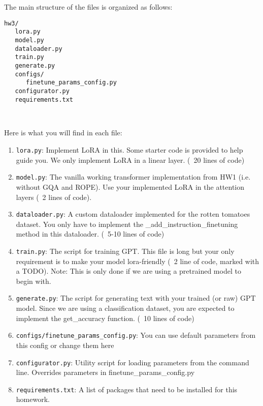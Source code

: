 \documentclass[11pt,addpoints,answers]{exam}
\begin{document}
\begin{questions}
The main structure of the files is organized as follows:
\begin{verbatim}
hw3/
   lora.py
   model.py
   dataloader.py
   train.py
   generate.py
   configs/
      finetune_params_config.py
   configurator.py
   requirements.txt
   
   
\end{verbatim}

Here is what you will find in each file:
\begin{enumerate}
    
    
    \item \lstinline{lora.py}: Implement LoRA in this. Some starter code is provided to help guide you. We only implement LoRA in a linear layer. (~20 lines of code)

    \item \lstinline{model.py}: The vanilla working transformer implementation from HW1 (i.e. without GQA and ROPE). Use your implemented LoRA in the attention layers (~2 lines of code).

    \item \lstinline{dataloader.py}: A custom dataloader implemented for the rotten tomatoes dataset. You only have to implement the \_add\_instruction\_finetuning method in this dataloader. (~5-10 lines of code)
    
    \item \lstinline{train.py}: The script for training GPT. This file is long but your only requirement is to make your model lora-friendly (~2 line of code, marked with a TODO). Note: This is only done if we are using a pretrained model to begin with.
    
    \item \lstinline{generate.py}: The script for generating text with your trained (or raw) GPT model. Since we are using a classification dataset, you are expected to implement the get\_accuracy function. (~10 lines of code) 
        
    \item \lstinline{configs/finetune_params_config.py}: You can use default parameters from this config or change them here 
    
    \item \lstinline{configurator.py}: Utility script for loading parameters from the command line. Overrides parameters in finetune\_params\_config.py

    \item \lstinline{requirements.txt}: A list of packages that need to be installed for this homework.
    

\end{enumerate}
\end{questions}
\end{document}
